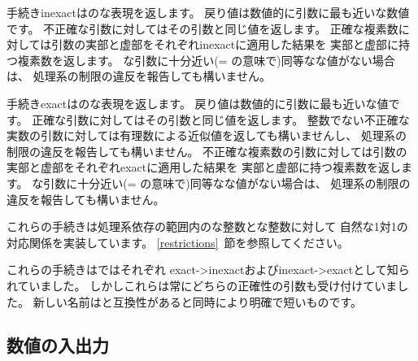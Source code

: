 \begin{entry}{%
}

手続き{\cf inexact}はのな表現を返します。
戻り値は数値的に引数に最も近いな数値です。
不正確な引数に対してはその引数と同じ値を返します。
正確な複素数に対しては引数の実部と虚部をそれぞれ{\cf inexact}に適用した結果を
実部と虚部に持つ複素数を返します。
な引数に十分近い({\cf =} の意味で)同等なな値がない場合は、
処理系の制限の違反を報告しても構いません。

手続き{\cf exact}はのな表現を返します。
戻り値は数値的に引数に最も近いな値です。
正確な引数に対してはその引数と同じ値を返します。
整数でない不正確な実数の引数に対しては有理数による近似値を返しても構いませんし、
処理系の制限の違反を報告しても構いません。
不正確な複素数の引数に対しては引数の実部と虚部をそれぞれ{\cf exact}に適用した結果を
実部と虚部に持つ複素数を返します。
な引数に十分近い({\cf =} の意味で)同等なな値がない場合は、
処理系の制限の違反を報告しても構いません。

これらの手続きは処理系依存の範囲内のな整数とな整数に対して
自然な1対1の対応関係を実装しています。
\ref{restrictions}~節を参照してください。

\begin{note}
これらの手続きは\rfivers{}ではそれぞれ
{\cf exact->inexact}および{\cf inexact->exact}として知られていました。
しかしこれらは常にどちらの正確性の引数も受け付けていました。
新しい名前は\rsixrs{}と互換性があると同時により明確で短いものです。
\end{note}

\end{entry}

\medskip

\subsection{数値の入出力}

